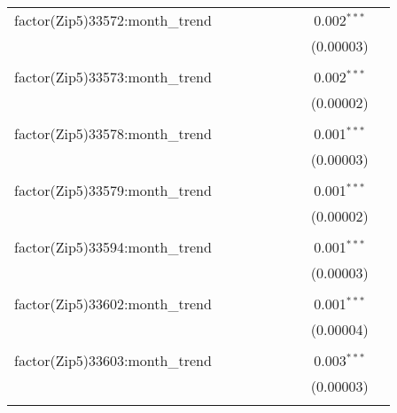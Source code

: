 \begin{table}[H]
{\begin{tabular}{@{\extracolsep{5pt}}lcccccccc}
  factor(Zip5)33572:month\_trend &  &  &  &  &  &  & 0.002$^{***}$ &  \\  

   &  &  &  &  &  &  & (0.00003) &  \\  

   & & & & & & & & \\  

  factor(Zip5)33573:month\_trend &  &  &  &  &  &  & 0.002$^{***}$ &  \\  

   &  &  &  &  &  &  & (0.00002) &  \\  

   & & & & & & & & \\  

  factor(Zip5)33578:month\_trend &  &  &  &  &  &  & 0.001$^{***}$ &  \\  

   &  &  &  &  &  &  & (0.00003) &  \\  

   & & & & & & & & \\  

  factor(Zip5)33579:month\_trend &  &  &  &  &  &  & 0.001$^{***}$ &  \\  

   &  &  &  &  &  &  & (0.00002) &  \\  

   & & & & & & & & \\  

  factor(Zip5)33594:month\_trend &  &  &  &  &  &  & 0.001$^{***}$ &  \\  

   &  &  &  &  &  &  & (0.00003) &  \\  

   & & & & & & & & \\  

  factor(Zip5)33602:month\_trend &  &  &  &  &  &  & 0.001$^{***}$ &  \\  

   &  &  &  &  &  &  & (0.00004) &  \\  

   & & & & & & & & \\  

  factor(Zip5)33603:month\_trend &  &  &  &  &  &  & 0.003$^{***}$ &  \\  

   &  &  &  &  &  &  & (0.00003) &  \\  

   & & & & & & & & \\  


\end{tabular}}
\end{table}
